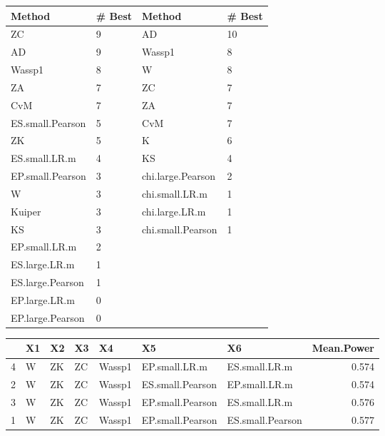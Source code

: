\documentclass[
]{article}
\begin{document}
\begin{table}[H]
\centering\begingroup\fontsize{15}{17}\selectfont

\begin{tabular}{l|l|l|l}
\hline
Method & \# Best & Method & \# Best\\
\hline
ZC & 9 & AD & 10\\
\hline
AD & 9 & Wassp1 & 8\\
\hline
Wassp1 & 8 & W & 8\\
\hline
ZA & 7 & ZC & 7\\
\hline
CvM & 7 & ZA & 7\\
\hline
ES.small.Pearson & 5 & CvM & 7\\
\hline
ZK & 5 & K & 6\\
\hline
ES.small.LR.m & 4 & KS & 4\\
\hline
EP.small.Pearson & 3 & chi.large.Pearson & 2\\
\hline
W & 3 & chi.small.LR.m & 1\\
\hline
Kuiper & 3 & chi.large.LR.m & 1\\
\hline
KS & 3 & chi.small.Pearson & 1\\
\hline
EP.small.LR.m & 2 &  & \\
\hline
ES.large.LR.m & 1 &  & \\
\hline
ES.large.Pearson & 1 &  & \\
\hline
EP.large.LR.m & 0 &  & \\
\hline
EP.large.Pearson & 0 &  & \\
\hline
\end{tabular}
\endgroup{}
\end{table}

\begin{table}[H]
\centering\begingroup\fontsize{15}{17}\selectfont

\begin{tabular}{l|l|l|l|l|l|l|r}
\hline
  & X1 & X2 & X3 & X4 & X5 & X6 & Mean.Power\\
\hline
4 & W & ZK & ZC & Wassp1 & EP.small.LR.m & ES.small.LR.m & 0.574\\
\hline
2 & W & ZK & ZC & Wassp1 & ES.small.Pearson & EP.small.LR.m & 0.574\\
\hline
3 & W & ZK & ZC & Wassp1 & EP.small.Pearson & ES.small.LR.m & 0.576\\
\hline
1 & W & ZK & ZC & Wassp1 & EP.small.Pearson & ES.small.Pearson & 0.577\\
\hline
\end{tabular}
\endgroup{}
\end{table}
\end{document}

